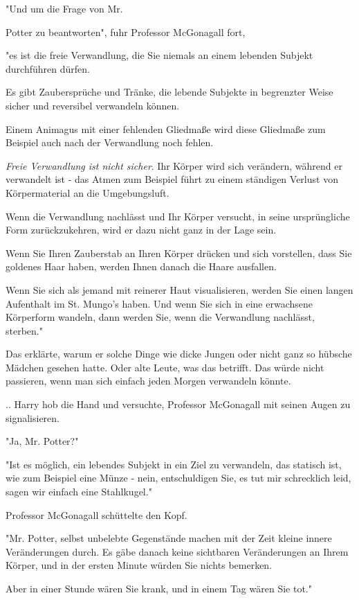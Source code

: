 {"Und um die Frage von Mr.

Potter zu beantworten", fuhr Professor McGonagall fort,

"es ist die freie Verwandlung, die Sie niemals an einem lebenden Subjekt durchführen dürfen.

Es gibt Zaubersprüche und Tränke, die lebende Subjekte in begrenzter Weise sicher und reversibel verwandeln können.

Einem Animagus mit einer fehlenden Gliedmaße wird diese Gliedmaße zum Beispiel auch nach der Verwandlung noch fehlen.

\emph{Freie Verwandlung ist nicht sicher}. Ihr Körper wird sich verändern, während er verwandelt ist - das Atmen zum Beispiel führt zu einem ständigen Verlust von Körpermaterial an die Umgebungsluft.

Wenn die Verwandlung nachlässt und Ihr Körper versucht, in seine ursprüngliche Form zurückzukehren, wird er dazu nicht ganz in der Lage sein.

Wenn Sie Ihren Zauberstab an Ihren Körper drücken und sich vorstellen, dass Sie goldenes Haar haben, werden Ihnen danach die Haare ausfallen.

Wenn Sie sich als jemand mit reinerer Haut visualisieren, werden Sie einen langen Aufenthalt im St. Mungo's haben. Und wenn Sie sich in eine erwachsene Körperform wandeln, dann werden Sie, wenn die Verwandlung nachlässt, sterben."

Das erklärte, warum er solche Dinge wie dicke Jungen oder nicht ganz so hübsche Mädchen gesehen hatte. Oder alte Leute, was das betrifft. Das würde nicht passieren, wenn man sich einfach jeden Morgen verwandeln könnte.

.. Harry hob die Hand und versuchte, Professor McGonagall mit seinen Augen zu signalisieren.

"Ja, Mr. Potter?"

"Ist es möglich, ein lebendes Subjekt in ein Ziel zu verwandeln, das statisch ist, wie zum Beispiel eine Münze - nein, entschuldigen Sie, es tut mir schrecklich leid, sagen wir einfach eine Stahlkugel."

Professor McGonagall schüttelte den Kopf.

"Mr. Potter, selbst unbelebte Gegenstände machen mit der Zeit kleine innere Veränderungen durch. Es gäbe danach keine sichtbaren Veränderungen an Ihrem Körper, und in der ersten Minute würden Sie nichts bemerken.

Aber in einer Stunde wären Sie krank, und in einem Tag wären Sie tot."

}
